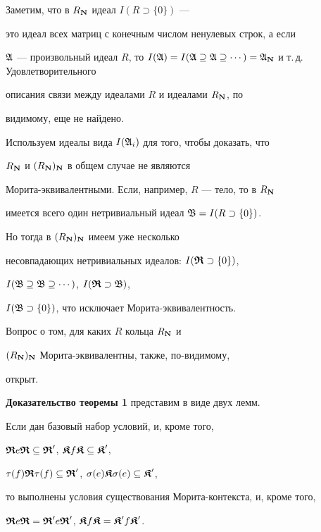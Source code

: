 Заметим, что в $R_{\bold N}$ идеал $I(R \supset \{ 0 \})$ ---


это идеал всех матриц с конечным числом ненулевых строк, а если


$\A$ --- произвольный идеал $R$, то $I(\A)=I(\A \supseteq \A


\supseteq \dotsb)=\A_{\bold N}$ и т.\,д. Удовлетворительного


описания связи между идеалами $R$ и идеалами $R_{\bold N}$, по


видимому, еще не найдено.





Используем идеалы вида $I(\frak A_i)$ для того, чтобы доказать, что


$R_{\bold N}$ и $({R_{\bold N}})_{\bold N}$ в общем случае не являются


Морита-эквивалентными. Если, например, $R$ --- тело, то в $R_{\bold N}$


имеется всего один нетривиальный идеал $\frak B=I(R\supset \{ 0 \})$.


Но тогда в $({R_{\bold N}})_{\bold N}$ имеем уже несколько


несовпадающих нетривиальных идеалов: $I(\boldsymbol{\frak R} \supset \{0\})$,


$I(\frak B\supseteq\frak B\supseteq\dotsb)$, $I(\boldsymbol{\frak R}\supset\frak B)$,


$I(\frak B\supset \{0\})$, что исключает Морита-эквивалентность.


Вопрос о том, для каких $R$ кольца $R_{\bold N}$ и


$({R_{\bold N}})_{\bold N}$ Морита-эквивалентны, также, по-видимому,


открыт.





{\bf Доказательство теоремы 1} представим в виде двух лемм.





\begin{lem} Если дан базовый набор условий, и, кроме того,


$ \boldsymbol{\frak R} e \boldsymbol{\frak R} \subseteq \boldsymbol{\frak R}'$, $\boldsymbol{\frak K} f \boldsymbol{\frak K} \subseteq \boldsymbol{\frak K}'$,


$ \tau(f) \boldsymbol{\frak R} \tau(f)\subseteq \boldsymbol{\frak R}'$, $\sigma(e) \boldsymbol{\frak K}\sigma(e)\subseteq \boldsymbol{\frak K}'$,


то выполнены условия существования Морита-контекста, и, кроме того,


$ \boldsymbol{\frak R} e \boldsymbol{\frak R} = \boldsymbol{\frak R}' e \boldsymbol{\frak R}'$, $\boldsymbol{\frak K} f \boldsymbol{\frak K} = \boldsymbol{\frak K}' f \boldsymbol{\frak K}' $.


\end{lem}





